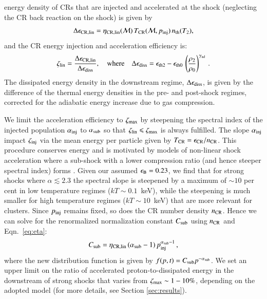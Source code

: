 \documentclass[a4paper,fleqn,usenatbib]{mnras}
\newcommand\eb{\epsilon_\rmn{B}}
\begin{document}
energy density of CRs that are injected and accelerated at the shock
(neglecting the CR back reaction on the shock) is given by
\begin{equation}
\label{eq:CR_energy} 
  \Delta\epsilon_{\mathrm{CR,lin}} =
  \eta_{\mathrm{CR,lin}}(\mathcal{M})\,T_{\mathrm{CR}}(\mathcal{M},p_{\mathrm{inj}})\,n_{\mathrm{th}}(T_2),
\end{equation}
and the CR energy injection and acceleration efficiency is:
\begin{equation}
  \zeta_{\mathrm{lin}} =
  \frac{\Delta\epsilon_{\mathrm{CR,lin}}}{\Delta\epsilon_{\mathrm{diss}}},
   \quad\mbox{where}\quad
  \Delta\epsilon_{\mathrm{diss}} = \epsilon_{\mathrm{th2}} - \epsilon_{\mathrm{th0}}\,\left(\frac{\rho_2}{\rho_0}\right)^{\gamma_{\mathrm{ad}}}\,.
\label{eqn:energy_frac}  
\end{equation}
The dissipated energy density in the downstream regime,
$\Delta\epsilon_{\mathrm{diss}}$, is given by the difference of the thermal
energy densities in the pre- and post-shock regimes, corrected for the
adiabatic energy increase due to gas compression.

We limit the acceleration efficiency to $\zeta_{\mathrm{max}}$ by
steepening the spectral index of the injected population
$\alpha_{\mathrm{inj}}$ to $\alpha_{\mathrm{sub}}$ so that $\zeta_{\mathrm{lin}}
\leqslant \zeta_{\mathrm{max}}$ is always fulfilled. The slope
$\alpha_{\mathrm{inj}}$ impact $\zeta_{\mathrm{inj}}$ via the mean energy per
particle given by $T_{\mathrm{CR}} = \epsilon_{\mathrm{CR}}/n_{\mathrm{CR}}$. This
procedure conserves energy and is motivated by models of non-linear
shock acceleration where a sub-shock with a lower compression ratio
(and hence steeper spectral index) forms
\citep[e.g.,][]{2000ApJ...540..292E}. Given our assumed $\eb=0.23$, we
find that for strong shocks where $\alpha \lesssim 2.3$ the spectral
slope is steepened by a maximum of $\sim 10$ per cent in low
temperature regimes ($kT\sim 0.1$~keV), while the steepening is much
smaller for high temperature regimes ($kT\sim 10$~keV) that are more
relevant for clusters. Since $p_{\mathrm{inj}}$ remains fixed, so does the
CR number density $n_{\mathrm{CR}}$. Hence we can solve for the
renormalized normalization constant $C_{\mathrm{sub}}$ using $n_{\mathrm{CR}}$
and Eqn.~\ref{eq:eta}:
\begin{equation}
  \label{eq:Cp_sub}
  C_{\mathrm{sub}}=\eta_{\mathrm{CR,lin}}\,(\alpha_{\mathrm{sub}}-1)\,p_{\mathrm{inj}}^{\alpha_{\mathrm{sub}}-1}\,,
\end{equation}
where the new distribution function is given by $f(p,t)= C_{\mathrm{sub}}
p^{-\alpha_{\mathrm{sub}}}$. We set an upper limit on the ratio of
accelerated proton-to-dissipated energy in the downstream of strong
shocks that varies from $\zeta_{\mathrm{max}} \sim 1-10\%$, depending on
the adopted model (for more details, see Section \ref{sec:results}).
\end{document}
